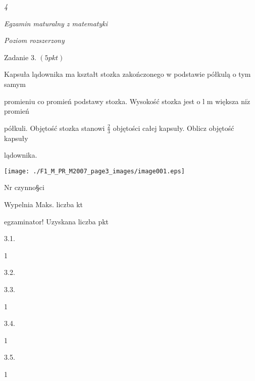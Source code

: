 \documentclass[a4paper,12pt]{article}
\begin{document}
{\it 4}

{\it Egzamin maturalny z matematyki}

{\it Poziom rozszerzony}

Zadanie 3. $(5pkt)$

Kapsuła lądownika ma kształt stozka zakończonego w podstawie półkulą o tym samym

promieniu co promień podstawy stozka. Wysokość stozka jest o l $\mathrm{m}$ większa $\mathrm{n}\mathrm{i}\dot{\mathrm{z}}$ promień

półkuli. Objętość stozka stanowi $\displaystyle \frac{2}{3}$ objętości całej kapsuły. Oblicz objętość kapsuły

lądownika.
\begin{center}
\texttt{[image: ./F1\_M\_PR\_M2007\_page3\_images/image001.eps]}
\end{center}
Nr czynno\S ci

Wypelnia Maks. liczba kt

egzaminator! Uzyskana liczba pkt

3.1.

1

3.2.

3.3.

1

3.4.

1

3.5.

1
\end{document}
